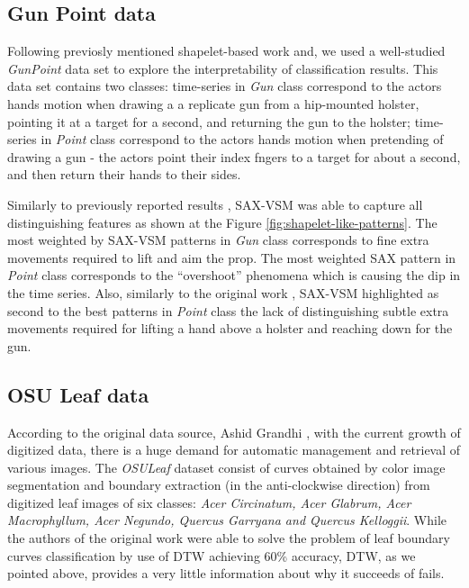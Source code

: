 \documentclass{llncs}
\begin{document}
\subsection{Gun Point data}
Following previosly mentioned shapelet-based work \cite{shapelet} and\cite{bagnal}, 
we used a well-studied \textit{GunPoint} data set \cite{gun} to explore the 
interpretability of classification results. This data set contains two classes: 
time-series in \textit{Gun} class correspond to the actors hands motion when drawing a 
a replicate gun from a hip-mounted holster, pointing it at a target for a second,
and returning the gun to the holster; 
time-series in \textit{Point} class correspond to the actors hands motion when pretending
of drawing a gun - the actors point their index fngers to a target for about a second, 
and then return their hands to their sides. 

Similarly to previously reported results \cite{shapelet} \cite{bagnal}, 
SAX-VSM was able to capture all distinguishing features as shown at the 
Figure \ref{fig:shapelet-like-patterns}. The most weighted by SAX-VSM patterns in 
\textit{Gun} class corresponds to fine extra movements required to lift and aim the prop. 
The most weighted SAX pattern in \textit{Point} class corresponds to the ``overshoot''
phenomena which is causing the dip in the time series. 
Also, similarly to the original work \cite{gun}, SAX-VSM highlighted as second to the best
patterns in \textit{Point} class the lack of distinguishing subtle extra movements required
for lifting a hand above a holster and reaching down for the gun.

\subsection{OSU Leaf data}
According to the original data source, Ashid Grandhi \cite{osuleaf}, with the current growth of
digitized data, there is a huge demand for automatic management and retrieval of various images. The
\textit{OSULeaf} dataset consist of curves obtained by color image segmentation and boundary
extraction (in the anti-clockwise direction) from digitized leaf images of six classes: \textit{Acer
Circinatum, Acer Glabrum, Acer Macrophyllum, Acer Negundo, Quercus Garryana and Quercus Kelloggii}.
While the authors of the original work were able to solve the problem of leaf boundary curves
classification by use of DTW achieving 60\% accuracy, DTW, as we pointed above, provides a very
little information about why it succeeds of fails. 
\end{document}
